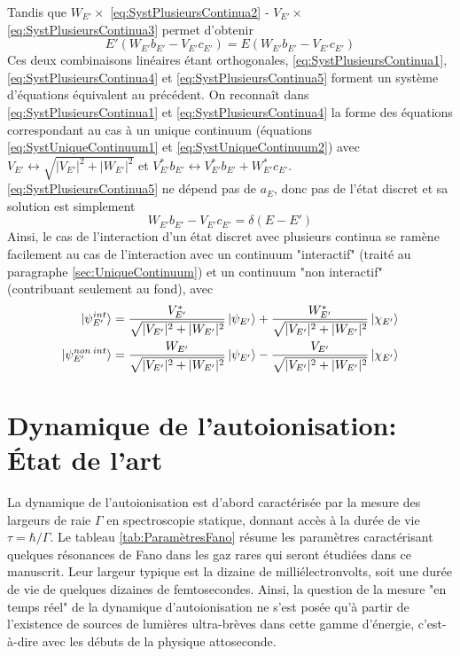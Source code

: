 Tandis que $W_{E'} \times$ \ref{eq:SystPlusieursContinua2} - $V_{E'} \times$ \ref{eq:SystPlusieursContinua3} permet d'obtenir 
\begin{equation}
E' \left( W_{E'} b_{E'} - V_{E'} c_{E'} \right) = E \left( W_{E'} b_{E'} - V_{E'} c_{E'} \right)
\label{eq:SystPlusieursContinua5}
\end{equation}
Ces deux combinaisons linéaires étant orthogonales, \ref{eq:SystPlusieursContinua1}, \ref{eq:SystPlusieursContinua4} et \ref{eq:SystPlusieursContinua5} forment un système d'équations équivalent au précédent. On reconnaît dans \ref{eq:SystPlusieursContinua1} et \ref{eq:SystPlusieursContinua4} la forme des équations correspondant au cas à un unique continuum (équations \ref{eq:SystUniqueContinuum1} et \ref{eq:SystUniqueContinuum2}) avec $V_{E'} \leftrightarrow \sqrt{|V_{E'}|^2 + |W_{E'}|^2}$ et $V^*_{E'} b_{E'} \leftrightarrow V^*_{E'} b_{E'} + W^*_{E'} c_{E'}$.\\
\ref{eq:SystPlusieursContinua5} ne dépend pas de $a_E$, donc pas de l'état discret et sa solution est simplement
\begin{equation}
W_{E'} b_{E'} - V_{E'} c_{E'} = \delta (E-E')
\end{equation}
Ainsi, le cas de l'interaction d'un état discret avec plusieurs continua se ramène facilement au cas de l'interaction avec un continuum "interactif" (traité au paragraphe \ref{sec:UniqueContinuum}) et un continuum "non interactif" (contribuant seulement au fond), avec
\begin{align}
\ket{\psi^{int}_{E'}} & = \frac{V^*_{E'}}{\sqrt{|V_{E'}|^2 + |W_{E'}|^2}} \ket{\psi_{E'}} + \frac{W^*_{E'}}{\sqrt{|V_{E'}|^2 + |W_{E'}|^2}} \ket{\chi_{E'}} \\
\ket{\psi^{non \: int}_{E'}} & = \frac{W_{E'}}{\sqrt{|V_{E'}|^2 + |W_{E'}|^2}} \ket{\psi_{E'}} - \frac{V_{E'}}{\sqrt{|V_{E'}|^2 + |W_{E'}|^2}} \ket{\chi_{E'}} 
\end{align}

\section{Dynamique de l'autoionisation: \'Etat de l'art}
La dynamique de l'autoionisation est d'abord caractérisée par la mesure des largeurs de raie $\Gamma$ en spectroscopie statique, donnant accès à la durée de vie $\tau = \hbar / \Gamma$. Le tableau \ref{tab:ParamètresFano} résume les paramètres caractérisant quelques résonances de Fano dans les gaz rares qui seront étudiées dans ce manuscrit. Leur largeur typique est la dizaine de milliélectronvolts, soit une durée de vie de quelques dizaines de femtosecondes. Ainsi, la question de la mesure "en temps réel" de la dynamique d'autoionisation ne s'est posée qu'à partir de l'existence de sources de lumières ultra-brèves dans cette gamme d'énergie, c'est-à-dire avec les débuts de la physique attoseconde.

